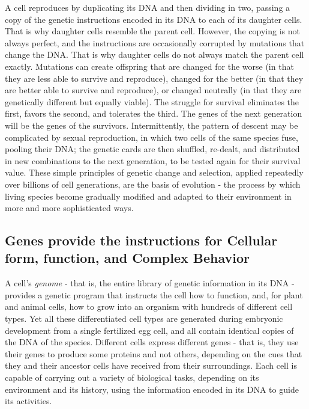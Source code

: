 A cell reproduces by duplicating its DNA and then dividing in two, passing
a copy of the genetic instructions encoded in its DNA to each of its daughter
cells. That is why daughter cells resemble the parent cell. However,
the copying is not always perfect, and the instructions are occasionally
corrupted by mutations that change the DNA. That is why daughter cells
do not always match the parent cell exactly.
Mutations can create offspring that are changed for the worse (in that
they are less able to survive and reproduce), changed for the better (in
that they are better able to survive and reproduce), or changed neutrally
(in that they are genetically different but equally viable). The struggle
for survival eliminates the first, favors the second, and tolerates the
third. The genes of the next generation will be the genes of the survivors.
Intermittently, the pattern of descent may be complicated by sexual
reproduction, in which two cells of the same species fuse, pooling their
DNA; the genetic cards are then shuffled, re-dealt, and distributed in new
combinations to the next generation, to be tested again for their survival
value.
These simple principles of genetic change and selection, applied repeatedly
over billions of cell generations, are the basis of evolution - the
process by which living species become gradually modified and adapted
to their environment in more and more sophisticated ways.

\subsection{Genes provide the instructions for Cellular form, function, and Complex Behavior}

A cell’s \textit{genome} - that is, the entire library of genetic information in its
DNA - provides a genetic program that instructs the cell how to function,
and, for plant and animal cells, how to grow into an organism with
hundreds of different cell types.
Yet all these differentiated cell types are generated during
embryonic development from a single fertilized egg cell, and all contain
identical copies of the DNA of the species.
Different
cells express different genes - that is, they use their genes to produce
some proteins and not others, depending on the cues that they and their
ancestor cells have received from their surroundings.
Each cell is capable of carrying out a variety of biological
tasks, depending on its environment and its history, using the information
encoded in its DNA to guide its activities.

